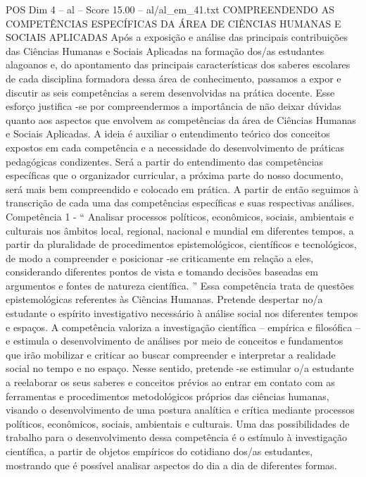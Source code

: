 \begin{textsample}{POS Dim 4 – al – Score 15.00 – al/al\_em\_41.txt}  \label{ex:f4_pos_050}
COMPREENDENDO AS COMPETÊNCIAS ESPECÍFICAS DA ÁREA DE CIÊNCIAS HUMANAS E SOCIAIS APLICADAS Após a exposição e análise das principais contribuições das Ciências Humanas e Sociais Aplicadas na formação dos/as estudantes alagoanos e, do apontamento das principais características dos saberes escolares de cada disciplina formadora dessa área de conhecimento, passamos a expor e discutir as seis competências a serem desenvolvidas na prática docente.
Esse esforço justifica -se por compreendermos a importância de não deixar dúvidas quanto aos aspectos que envolvem as competências da área de Ciências Humanas e Sociais Aplicadas.
A ideia é auxiliar o entendimento teórico dos conceitos expostos em cada competência e a necessidade do desenvolvimento de práticas pedagógicas condizentes.
Será a partir do entendimento das competências específicas que o organizador curricular, a próxima parte do nosso documento, será mais bem compreendido e colocado em prática.
A partir de então seguimos à transcrição de cada uma das competências específicas e suas respectivas análises.
Competência 1 - “ Analisar processos políticos, econômicos, sociais, ambientais e culturais nos âmbitos local, regional, nacional e mundial em diferentes tempos, a partir da pluralidade de procedimentos epistemológicos, científicos e tecnológicos, de modo a compreender e posicionar -se criticamente em relação a eles, considerando diferentes pontos de vista e tomando decisões baseadas em argumentos e fontes de natureza científica. ” Essa competência trata de questões epistemológicas referentes às Ciências Humanas.
Pretende despertar no/a estudante o espírito investigativo necessário à análise social nos diferentes tempos e espaços.
A competência valoriza a investigação científica – empírica e filosófica – e estimula o desenvolvimento de análises por meio de conceitos e fundamentos que irão mobilizar e criticar ao buscar compreender e interpretar a realidade social no tempo e no espaço.
Nesse sentido, pretende -se estimular o/a estudante a reelaborar os seus saberes e conceitos prévios ao entrar em contato com as ferramentas e procedimentos metodológicos próprios das ciências humanas, visando o desenvolvimento de uma postura analítica e crítica mediante processos políticos, econômicos, sociais, ambientais e culturais.
Uma das possibilidades de trabalho para o desenvolvimento dessa competência é o estímulo à investigação científica, a partir de objetos empíricos do cotidiano dos/as estudantes, mostrando que é possível analisar aspectos do dia a dia de diferentes formas.

\end{textsample}
